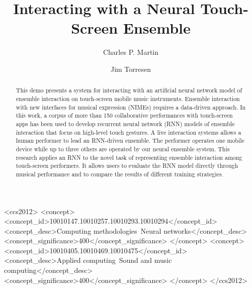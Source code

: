 \documentclass[sigchi-a, authorversion]{acmart}
\begin{document}
\title{Interacting with a Neural Touch-Screen Ensemble}

\author{Charles P. Martin}


\author{Jim Torresen}

%
%
\begin{CCSXML}
<ccs2012>
<concept>
<concept_id>10010147.10010257.10010293.10010294</concept_id>
<concept_desc>Computing methodologies~Neural networks</concept_desc>
<concept_significance>400</concept_significance>
</concept>
<concept>
<concept_id>10010405.10010469.10010475</concept_id>
<concept_desc>Applied computing~Sound and music computing</concept_desc>
<concept_significance>400</concept_significance>
</concept>
</ccs2012>
\end{CCSXML}


\begin{abstract}
  This demo presents a system for interacting with an artificial neural network model of ensemble interaction on touch-screen mobile music instruments. Ensemble interaction with new interfaces for musical expression (NIMEs) requires a data-driven approach. In this work, a corpus of more than 150 collaborative performances with touch-screen apps has been used to develop recurrent neural network (RNN) models of ensemble interaction that focus on high-level touch gestures. A live interaction systems allows a human performer to lead an RNN-driven ensemble. The performer operates one mobile device while up to three others are operated by our neural ensemble system. This research applies an RNN to the novel task of representing ensemble interaction among touch-screen performers. It allows users to evaluate the RNN model directly through musical performance and to compare the results of different training strategies.
\end{abstract}

\end{document}
